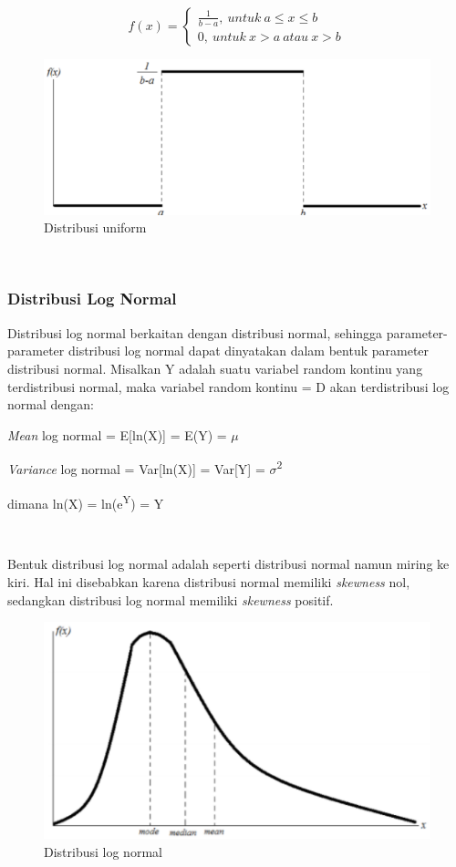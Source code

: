 \documentclass[
]{book}
\begin{document}
\[
f(x)=
\begin{cases}
  \frac{1}{b-a},\ untuk\ a \leq x \leq b\\
  0,\ untuk\ x > a\ atau\ x > b
\end{cases}
\]

\begin{figure}

{\centering \includegraphics[width=0.5\linewidth]{images/screening/distribusi_uniform} 

}

\caption{Distribusi uniform}\label{fig:unnamed-chunk-8}
\end{figure}

~

\hypertarget{distribusi-log-normal}{%
\subsubsection{Distribusi Log Normal}\label{distribusi-log-normal}}

Distribusi log normal berkaitan dengan distribusi normal, sehingga parameter-parameter distribusi log normal dapat dinyatakan dalam bentuk parameter distribusi normal. Misalkan Y adalah suatu variabel random kontinu yang terdistribusi normal, maka variabel random kontinu = D akan terdistribusi log normal dengan:

\emph{Mean} log normal = E{[}ln(X){]} = E(Y) = \(\mu\)

\emph{Variance} log normal = Var{[}ln(X){]} = Var{[}Y{]} = \(\sigma\)\textsuperscript{2}

dimana ln(X) = ln(e\textsuperscript{Y}) = Y

~

Bentuk distribusi log normal adalah seperti distribusi normal namun miring ke kiri. Hal ini disebabkan karena distribusi normal memiliki \emph{skewness} nol, sedangkan distribusi log normal memiliki \emph{skewness} positif.

\begin{figure}

{\centering \includegraphics[width=0.5\linewidth]{images/screening/distribusi_log_normal} 

}

\caption{Distribusi log normal}\label{fig:unnamed-chunk-9}
\end{figure}
\end{document}
